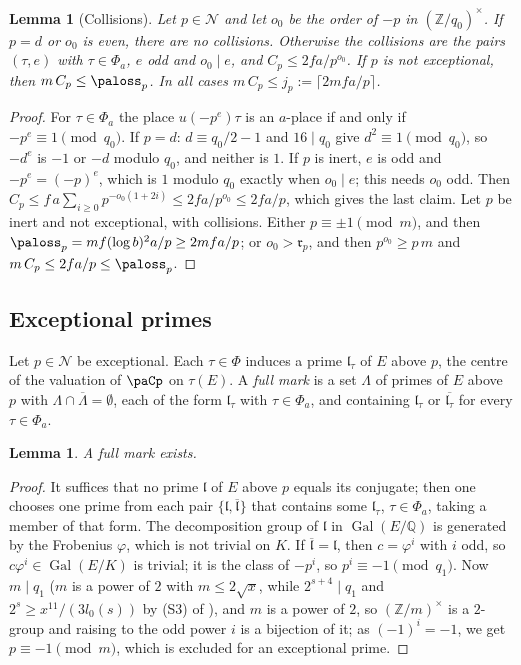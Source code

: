 \documentclass[10pt]{amsart}
\newtheorem{lemma}[theorem]{Lemma}
\theoremstyle{definition}
\theoremstyle{remark}
\newcommand{\Z}{\mathbb Z}
\newcommand{\Q}{\mathbb Q}
\providecommand{\auPa}{\Phi_a}
\providecommand{\auPl}{\Phi}
\providecommand{\aubar}[1]{\overline{#1}}
\begin{document}
\begin{lemma}[Collisions]\label{pa:coll}
Let $p\in\mathcal N$ and let $o_0$ be the order of $-p$ in $(\Z/q_0)^\times$. If $p=d$ or $o_0$ is
even, there are no collisions. Otherwise the collisions are the pairs $(\tau,e)$ with
$\tau\in\auPa$, $e$ odd and $o_0\mid e$, and $C_p\le2fa/p^{o_0}$. If $p$ is not exceptional, then
$m\,C_p\le\paloss_p$. In all cases $m\,C_p\le j_p:=\lceil2mfa/p\rceil$.
\end{lemma}
\begin{proof}
For $\tau\in\auPa$ the place $u(-p^e)\tau$ is an $a$-place if and only if $-p^e\equiv1\pmod{q_0}$.
If $p=d$: $d\equiv q_0/2-1$ and $16\mid q_0$ give $d^2\equiv1\pmod{q_0}$, so $-d^e$ is $-1$ or $-d$
modulo $q_0$, and neither is $1$. If $p$ is inert, $e$ is odd and $-p^e=(-p)^e$, which is $1$
modulo $q_0$ exactly when $o_0\mid e$; this needs $o_0$ odd. Then
$C_p\le f\,a\sum_{i\ge0}p^{-o_0(1+2i)}\le2fa/p^{o_0}\le2fa/p$, which gives the last claim. Let $p$
be inert and not exceptional, with collisions. Either $p\equiv\pm1\pmod m$, and then
$\paloss_p=mf(\log b)^2a/p\ge2mfa/p$; or $o_0>\mathfrak r_p$, and then $p^{o_0}\ge p\,m$ and
$m\,C_p\le2fa/p\le\paloss_p$.
\end{proof}

\subsection*{Exceptional primes}
Let $p\in\mathcal N$ be exceptional. Each $\tau\in\auPl$ induces a prime $\mathfrak l_\tau$ of $E$
above $p$, the centre of the valuation of $\paCp$ on $\tau(E)$. A \emph{full mark} is a set
$\Lambda$ of primes of $E$ above $p$ with $\Lambda\cap\aubar\Lambda=\emptyset$, each of the form
$\mathfrak l_\tau$ with $\tau\in\auPa$, and containing $\mathfrak l_\tau$ or
$\aubar{\mathfrak l_\tau}$ for every $\tau\in\auPa$.

\begin{lemma}\label{pa:mark}
A full mark exists.
\end{lemma}
\begin{proof}
It suffices that no prime $\mathfrak l$ of $E$ above $p$ equals its conjugate; then one chooses
one prime from each pair $\{\mathfrak l,\aubar{\mathfrak l}\}$ that contains some
$\mathfrak l_\tau$, $\tau\in\auPa$, taking a member of that form. The decomposition group of
$\mathfrak l$ in $\operatorname{Gal}(E/\Q)$ is generated by the Frobenius $\varphi$, which is not
trivial on $K$. If $\aubar{\mathfrak l}=\mathfrak l$, then $c=\varphi^i$ with $i$ odd, so
$c\varphi^i\in\operatorname{Gal}(E/K)$ is trivial; it is the class of $-p^i$, so
$p^i\equiv-1\pmod{q_1}$. Now $m\mid q_1$ ($m$ is a power of $2$ with $m\le2\sqrt x$, while $2^{s+4}\mid q_1$ and $2^s\ge x^{11}/(3l_0(s))$ by (S3) of {\cite[Lemma~13.4]{P46}}), and $m$ is a power of $2$, so $(\Z/m)^\times$ is a $2$-group and raising to the
odd power $i$ is a bijection of it; as $(-1)^i=-1$, we get $p\equiv-1\pmod m$, which is excluded
for an exceptional prime.
\end{proof}
\end{document}
